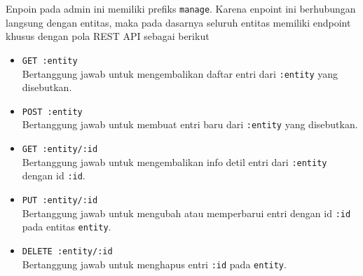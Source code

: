     Enpoin pada admin ini memiliki prefiks \texttt{manage}. Karena enpoint ini berhubungan langsung
    dengan entitas, maka pada dasarnya seluruh entitas memiliki endpoint khusus dengan pola REST API
    sebagai berikut
    \begin{itemize}
        \item \texttt{GET :entity} \\
            Bertanggung jawab untuk mengembalikan daftar entri dari \texttt{:entity} yang disebutkan.
            
        \item \texttt{POST :entity} \\
            Bertanggung jawab untuk membuat entri baru dari \texttt{:entity} yang disebutkan.
            
        \item \texttt{GET :entity/:id} \\
            Bertanggung jawab untuk mengembalikan info detil entri dari \texttt{:entity} dengan id 
            \texttt{:id}.
            
        \item \texttt{PUT :entity/:id} \\
            Bertanggung jawab untuk mengubah atau memperbarui entri dengan id \texttt{:id} pada entitas
            \texttt{entity}.
        
        \item \texttt{DELETE :entity/:id} \\
            Bertanggung jawab untuk menghapus entri \texttt{:id} pada \texttt{entity}.
    \end{itemize}
    
